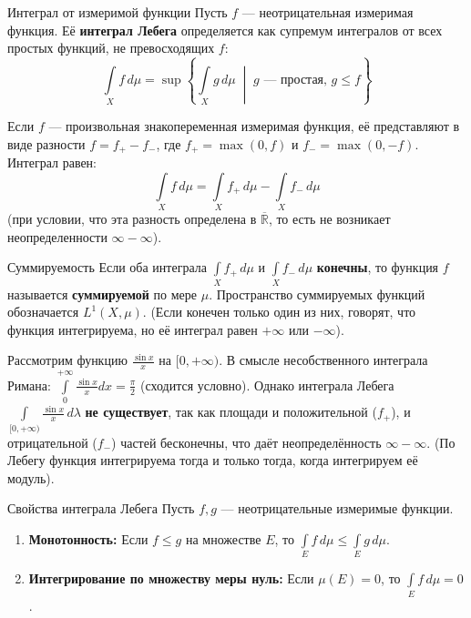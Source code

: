 \documentclass[12pt,a4paper]{article}
\begin{document}
\begin{Definition}{Интеграл от измеримой функции}{}
Пусть $f$ — неотрицательная измеримая функция. Её \textbf{интеграл Лебега} определяется как супремум интегралов от всех простых функций, не превосходящих $f$:
$$ \int\limits_X f \, d\mu = \sup \left\{ \int\limits_X g \, d\mu \;\middle|\; g \text{ — простая, } g \le f \right\} $$

Если $f$ — произвольная знакопеременная измеримая функция, её представляют в виде разности $f = f_+ - f_-$, где $f_+ = \max(0, f)$ и $f_- = \max(0, -f)$. Интеграл равен:
$$ \int\limits_X f \, d\mu = \int\limits_X f_+ \, d\mu - \int\limits_X f_- \, d\mu $$
(при условии, что эта разность определена в $\overline{\mathbb{R}}$, то есть не возникает неопределенности $\infty - \infty$).
\end{Definition}

\begin{Definition}{Суммируемость}{}
Если оба интеграла $\int\limits_X f_+ \, d\mu$ и $\int\limits_X f_- \, d\mu$ \textbf{конечны}, то функция $f$ называется \textbf{суммируемой} по мере $\mu$. Пространство суммируемых функций обозначается $L^1(X, \mu)$.
(Если конечен только один из них, говорят, что функция интегрируема, но её интеграл равен $+\infty$ или $-\infty$).
\end{Definition}

\begin{Example}
Рассмотрим функцию $\frac{\sin x}{x}$ на $[0, +\infty)$. 
В смысле несобственного интеграла Римана: $\int\limits_0^{+\infty} \frac{\sin x}{x} dx = \frac{\pi}{2}$ (сходится условно).
Однако интеграла Лебега $\int\limits_{[0, +\infty)} \frac{\sin x}{x} \, d\lambda$ \textbf{не существует}, так как площади и положительной ($f_+$), и отрицательной ($f_-$) частей бесконечны, что даёт неопределённость $\infty - \infty$. (По Лебегу функция интегрируема тогда и только тогда, когда интегрируем её модуль).
\end{Example}

\begin{Theorem}{Свойства интеграла Лебега}{}
Пусть $f, g$ — неотрицательные измеримые функции.
\begin{enumerate}
    \item \textbf{Монотонность:} Если $f \le g$ на множестве $E$, то $\int\limits_E f \, d\mu \le \int\limits_E g \, d\mu$.
    \item \textbf{Интегрирование по множеству меры нуль:} Если $\mu(E) = 0$, то $\int\limits_E f \, d\mu = 0$.
\end{enumerate}
\end{Theorem}
\end{document}
